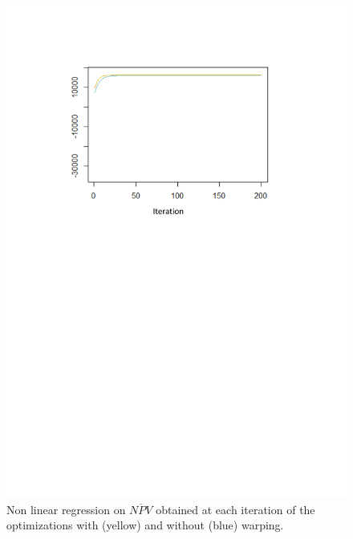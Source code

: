 \begin{figure}[!ht]
	\centering
	\includegraphics[trim = 4cm 15cm 4cm 3cm, clip]{Figures_Warping_resultats_courbes_regression_lineaire_warping_sanswarping.pdf}
	\caption{Non linear regression on $\overline{NPV}$ obtained at each iteration of the optimizations with (yellow) and without (blue) warping.}\label{fig:nonlinear_regression}
\end{figure}

